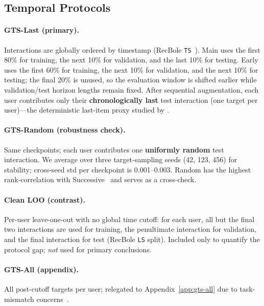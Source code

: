 \documentclass[sigconf,natbib=true,anonymous]{acmart}
\begin{document}
\subsection{Temporal Protocols}
\label{sec:protocol}

\paragraph{GTS-Last (primary).}
Interactions are globally ordered by timestamp (RecBole \texttt{TS}~\cite{zhao2021recbole}).
Main uses the first 80\% for training, the next 10\% for validation, and the last 10\% for testing.
Early uses the first 60\% for training, the next 10\% for validation, and the next 10\% for testing; the final 20\% is unused, so the evaluation window is shifted earlier while validation/test horizon lengths remain fixed.
After sequential augmentation, each user contributes only their \textbf{chronologically last} test interaction (one target per user)---the deterministic last-item proxy studied by \citet{gusak2025time}.

\paragraph{GTS-Random (robustness check).}
Same checkpoints; each user contributes one \textbf{uniformly random} test interaction.  We average over three target-sampling seeds (42, 123, 456) for stability; cross-seed std per checkpoint is 0.001--0.003.
Random has the highest rank-correlation with Successive~\cite{gusak2025time} and serves as a cross-check.

\paragraph{Clean LOO (contrast).}
Per-user leave-one-out with no global time cutoff: for each user, all but the final two interactions are used for training, the penultimate interaction for validation, and the final interaction for test (RecBole \texttt{LS} split).
Included only to quantify the protocol gap; \emph{not} used for primary conclusions.

\paragraph{GTS-All (appendix).}
All post-cutoff targets per user; relegated to Appendix~\ref{app:gts-all} due to task-mismatch concerns~\cite{gusak2025time}.
\end{document}

